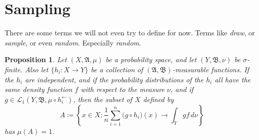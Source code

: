 \documentclass[
twoside=true,
paper=letter,
fontsize=9pt,
pagesize=auto,
leqno,
openany,
headsepline,
overfullrule,
]{scrbook}
\theoremstyle{plain}
\theoremstyle{plain}
\newtheorem{prop}[thm]{Proposition}
\theoremstyle{definition}
\theoremstyle{bfnoteitalic}
\theoremstyle{bfnoteroman}
\newcommand{\sigalg}[1]{\mathfrak{#1}}
\newcommand{\cali}[1]{\mathscr{#1}}
\newcommand{\definedby}{\coloneqq}
\newcommand{\textsigma}{\hbox{\large{$\sigma$}}\kern-1pt}
\newcommand{\preimage}[1]{#1^{\leftarrow}}
\newcommand{\sigmaalgebra}{\sigalg{A}}
\newcommand{\sigmaalgebraii}{\sigalg{B}}
\newcommand{\funcf}{f}
\newcommand{\funcg}{g}
\newcommand{\funch}{h}
\newcommand{\function}{f}
\newcommand{\functionii}{g}
\newcommand{\functioniii}{h}
\newcommand{\measurespace}{X}
\newcommand{\measurespaceii}{Y}
\newcommand{\mspaceelt}{x}
\newcommand{\measure}{\mu}
\newcommand{\measmu}{\mu}
\newcommand{\measnu}{\nu}
\newcommand{\seti}{A}
\begin{document}
\section{Sampling}
There are some terms we will not even try to define for now.
Terms like \emph{draw}, or \emph{sample}, or even \emph{random}. Especially \emph{random}.



\begin{prop}\label{sampling}
Let $(\measurespace,\sigmaalgebra,\measmu)$ be a probability space, and let 
$(\measurespaceii,\sigmaalgebraii,\measnu)$ be \textsigma-finite.
Also let
$\{ \funch_i:\measurespace\to\measurespaceii \}$ be a collection of 
$(\sigmaalgebra,\sigmaalgebraii)$\hyp{}measurable functions.
If the $\funch_i$ are independent, and if the probability distributions of the 
$\funch_i$ all have the same density function 
$\funcf$ 
with respect to the measure $\measnu$,
and if 
$\funcg\in
\cali{L}_1(\measurespaceii,\sigmaalgebraii,\measmu\circ\preimage{\funch_i})$,
then the subset of $\measurespace$ defined by
\[
\seti \definedby
\left\{ 
\mspaceelt\in\measurespace : 
\frac{1}{n} \sum_{i=1}^n \bigl( \functionii\circ \functioniii_i \bigr) (x) 
\to
\int_\measurespaceii \functionii \function \,d\measnu 
\right\}
\]
has $\measure(\seti) = 1$.
\end{prop}
\end{document}
